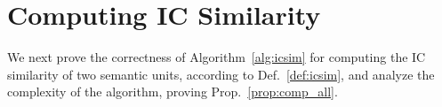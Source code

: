 

%




\section{Computing IC Similarity}
\label{complexity}
We next prove the correctness of Algorithm~\ref{alg:icsim} for computing the IC similarity of two semantic units, according to Def.~\ref{def:icsim}, and analyze the complexity of the algorithm, proving Prop.~\ref{prop:comp_all}. %

